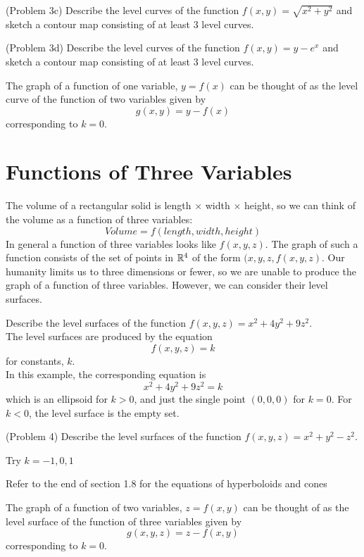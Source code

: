 \documentclass[handout]{ximera}
\begin{document}
\begin{problem}(Problem 3c)
Describe the level curves of the function $f(x, y) = \sqrt{x^2 + y^2}$ and sketch a contour map consisting of at least 3 level curves.\\
\end{problem}

\begin{problem}(Problem 3d)
Describe the level curves of the function $f(x,y) = y - e^x$ and sketch a contour map consisting of at least 3 level curves.\\
\end{problem}

\begin{remark}
The graph of a function of one variable, $y= f(x)$ can be thought of as the level curve of the function of two variables given by 
\[
g(x, y) = y-f(x)
\]
corresponding to $k = 0$.
\end{remark}

\section{Functions of Three Variables}
The volume of a rectangular solid is length $\times$ width $\times $ height, so we can think of the volume as a function of three variables:
\[
Volume = f(length, width, height)
\]
In general a function of three variables looks like $f(x, y, z)$.
The graph of such a function consists of the set of points in $\mathbb R^4$ of the form $(x, y, z, f(x, y, z)$.
Our humanity limits us to three dimensions or fewer, so we are unable to produce the graph of a function of three variables.
However, we can consider their level surfaces.

\begin{example}[Example 4]
Describe the level surfaces of the function $f(x, y, z) = x^2 + 4y^2 + 9 z^2$.\\
The level surfaces are produced by the equation
\[
f(x, y, z) = k
\]
for constants, $k$.\\
In this example, the corresponding equation is
\[
x^2 + 4y^2 + 9z^2 = k
\]
which is an ellipsoid for $k >0$, and just the single point $(0, 0, 0)$ for $k = 0$.
For $k<0$, the level surface is the empty set.
\end{example}

\begin{problem}(Problem 4)
Describe the level surfaces of the function $f(x, y, z) = x^2 + y^2 - z^2$.\\
\begin{hint}
Try $k = -1, 0, 1$
\end{hint}
\begin{hint}
Refer to the end of section 1.8 for the equations of hyperboloids and cones
\end{hint}
\end{problem}

\begin{remark}
The graph of a function of two variables, $z= f(x,y)$ can be thought of as the level surface of the function of three variables given by 
\[
g(x, y, z) = z-f(x,y)
\]
corresponding to $k = 0$.
\end{remark}
\end{document}
